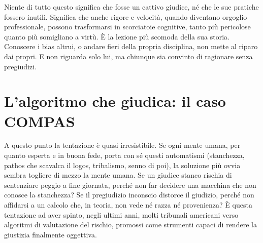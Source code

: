 Niente di tutto questo significa che fosse un cattivo giudice, n\'{e} che le sue pratiche fossero inutili. Significa che anche rigore e velocit\`{a}, quando diventano orgoglio professionale, possono trasformarsi in scorciatoie cognitive, tanto pi\`{u} pericolose quanto pi\`{u} somigliano a virt\`{u}. \`{E} la lezione pi\`{u} scomoda della sua storia. Conoscere i bias altrui, o andare fieri della propria disciplina, non mette al riparo dai propri. E non riguarda solo lui, ma chiunque sia convinto di ragionare senza pregiudizi.

\section{L'algoritmo che giudica: il caso COMPAS}
\label{sec:p2c28-compas}

A questo punto la tentazione \`{e} quasi irresistibile. Se ogni mente umana, per quanto esperta e in buona fede, porta con s\'{e} questi automatismi (stanchezza, pathos che scavalca il logos, tribalismo, senno di poi), la soluzione pi\`{u} ovvia sembra togliere di mezzo la mente umana. Se un giudice stanco rischia di sentenziare peggio a fine giornata, perch\'{e} non far decidere una macchina che non conosce la stanchezza? Se il pregiudizio inconscio distorce il giudizio, perch\'{e} non affidarsi a un calcolo che, in teoria, non vede n\'{e} razza n\'{e} provenienza? \`{E} questa tentazione ad aver spinto, negli ultimi anni, molti tribunali americani verso algoritmi di valutazione del rischio, promossi come strumenti capaci di rendere la giustizia finalmente oggettiva.

